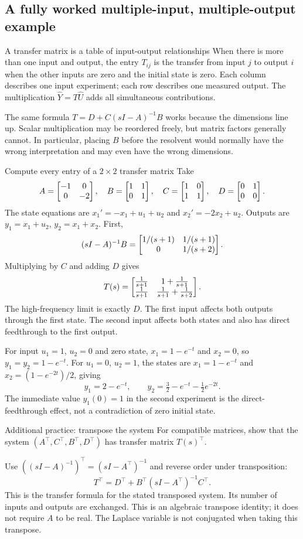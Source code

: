 \subsection{A fully worked multiple-input, multiple-output example}
\begin{concept}{A transfer matrix is a table of input-output relationships}
When there is more than one input and output, the entry $T_{ij}$ is the transfer from input $j$ to output $i$ when the other inputs are zero and the initial state is zero. Each column describes one input experiment; each row describes one measured output. The multiplication $\widehat Y=T\widehat U$ adds all simultaneous contributions.

The same formula $T=D+C(sI-A)^{-1}B$ works because the dimensions line up. Scalar multiplication may be reordered freely, but matrix factors generally cannot. In particular, placing $B$ before the resolvent would normally have the wrong interpretation and may even have the wrong dimensions.
\end{concept}
\begin{worked}{Compute every entry of a $2\times2$ transfer matrix}
Take
\[A=\begin{bmatrix}-1&0\\0&-2\end{bmatrix},\quad B=\begin{bmatrix}1&1\\0&1\end{bmatrix},\quad C=\begin{bmatrix}1&0\\1&1\end{bmatrix},\quad D=\begin{bmatrix}0&1\\0&0\end{bmatrix}.\]
The state equations are $x_1'=-x_1+u_1+u_2$ and $x_2'=-2x_2+u_2$. Outputs are $y_1=x_1+u_2$, $y_2=x_1+x_2$. First,
\[(sI-A)^{-1}B=\begin{bmatrix}1/(s+1)&1/(s+1)\\0&1/(s+2)\end{bmatrix}.\]
Multiplying by $C$ and adding $D$ gives
\[T(s)=\begin{bmatrix}\frac1{s+1}&1+\frac1{s+1}\\\frac1{s+1}&\frac1{s+1}+\frac1{s+2}\end{bmatrix}.\]
The high-frequency limit is exactly $D$. The first input affects both outputs through the first state. The second input affects both states and also has direct feedthrough to the first output.

For input $u_1=1$, $u_2=0$ and zero state, $x_1=1-e^{-t}$ and $x_2=0$, so $y_1=y_2=1-e^{-t}$. For $u_1=0$, $u_2=1$, the states are $x_1=1-e^{-t}$ and $x_2=(1-e^{-2t})/2$, giving
\[y_1=2-e^{-t},\qquad y_2=\tfrac32-e^{-t}-\tfrac12e^{-2t}.\]
The immediate value $y_1(0)=1$ in the second experiment is the direct-feedthrough effect, not a contradiction of zero initial state.
\end{worked}
\begin{question}{Additional practice: transpose the system}
For compatible matrices, show that the system $(A^{\top},C^{\top},B^{\top},D^{\top})$ has transfer matrix $T(s)^{\top}$.
\end{question}
\begin{answer}
Use $((sI-A)^{-1})^{\top}=(sI-A^{\top})^{-1}$ and reverse order under transposition:
\[T^{\top}=D^{\top}+B^{\top}(sI-A^{\top})^{-1}C^{\top}.\]
This is the transfer formula for the stated transposed system. Its number of inputs and outputs are exchanged. This is an algebraic transpose identity; it does not require $A$ to be real. The Laplace variable is not conjugated when taking this transpose.
\end{answer}

